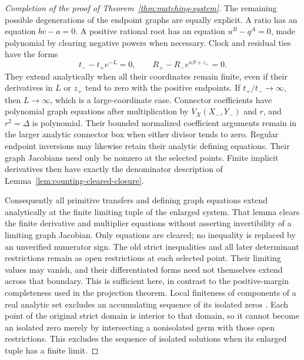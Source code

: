 \begin{proof}[Completion of the proof of Theorem~\ref{thm:matching-system}]
The remaining possible degenerations of the endpoint graphs are
equally explicit.  A ratio has an equation $bv-a=0$.  A positive
rational root has an equation $u^B-q^A=0$, made polynomial by
clearing negative powers when necessary.  Clock and residual ties have
the forms
\[
 t_- -t_+e^{-L}=0,
 \qquad R_+-R_-e^{\kappa S+z_+}=0.
\]
They extend analytically when all their coordinates remain finite,
even if their derivatives in $L$ or $z_+$ tend to zero with the
positive endpoints.  If $t_+/t_-\to\infty$, then
$L\to\infty$, which is a large-coordinate case.  Connector
coefficients have polynomial graph equations after multiplication by
$V_X(X_-,Y_-)$ and $r$, and $r^2=\Delta$ is polynomial.  Their
bounded normalized coefficient arguments remain in the larger
analytic connector box when either divisor tends to zero.
Regular endpoint inversions may likewise retain their analytic
defining equations.  Their graph Jacobians need only be nonzero at
the selected points.  Finite implicit derivatives then have exactly
the denominator description of
Lemma~\ref{lem:counting-cleared-closure}.

Consequently all primitive transfers and defining graph equations
extend analytically at the finite limiting tuple of the enlarged
system.  That lemma clears
the finite derivative and multiplier equations without asserting
invertibility of a limiting graph Jacobian.  Only equations are
cleared; no inequality is replaced by an unverified numerator sign.
The old strict inequalities and all later determinant restrictions
remain as open restrictions at each selected point.  Their limiting
values may vanish, and their differentiated forms need not themselves
extend across that boundary.  This is sufficient here, in contrast
to the positive-margin completeness used in the projection theorem.
Local finiteness of components
of a real analytic set excludes an accumulating sequence of its
isolated zeros \cite[Corollary~2.7]{BierstoneMilman1988}.
Each point of the original strict domain is interior to that domain,
so it cannot become an isolated zero merely by intersecting a
nonisolated germ with those open restrictions.  This excludes the sequence of isolated solutions when its enlarged
tuple has a finite limit.


\end{proof}
